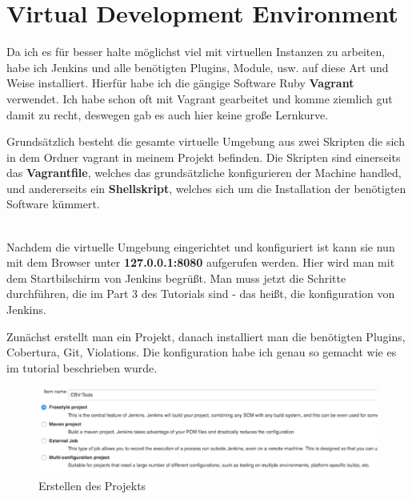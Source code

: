 \section{Virtual Development Environment}
\label{sec:VDE}

Da ich es für besser halte möglichst viel mit virtuellen Instanzen zu arbeiten, habe ich Jenkins und alle benötigten Plugins, Module, usw. auf diese Art und Weise installiert. Hierfür habe ich die gängige Software Ruby \textbf{Vagrant} verwendet. Ich habe schon oft mit Vagrant gearbeitet und komme ziemlich gut damit zu recht, deswegen gab es auch hier keine große Lernkurve. 

Grundsätzlich besteht die gesamte virtuelle Umgebung aus zwei Skripten die sich in dem Ordner vagrant in meinem Projekt befinden. Die Skripten sind einerseits das \textbf{Vagrantfile}, welches das grundsätzliche konfigurieren der Machine handled, und andererseits ein \textbf{Shellskript}, welches sich um die Installation der benötigten Software kümmert. \\ \\


\clearpage


\newpage

Nachdem die virtuelle Umgebung eingerichtet und konfiguriert ist kann sie nun mit dem Browser unter \textbf{127.0.0.1:8080} aufgerufen werden. Hier wird man mit dem Startbilschirm von Jenkins begrüßt. Man muss jetzt die Schritte durchführen, die im Part 3 des Tutorials sind - das heißt, die konfiguration von Jenkins.

Zunächst erstellt man ein Projekt, danach installiert man die benötigten Plugins, Cobertura, Git, Violations. Die konfiguration habe ich genau so gemacht wie es im tutorial beschrieben wurde. 

\vfill
\begin{figure}[h!]
	\caption{Erstellen des Projekts}
	\centering
	\includegraphics[width=\textwidth]{images/jenkins_config1.png}
\end{figure}

